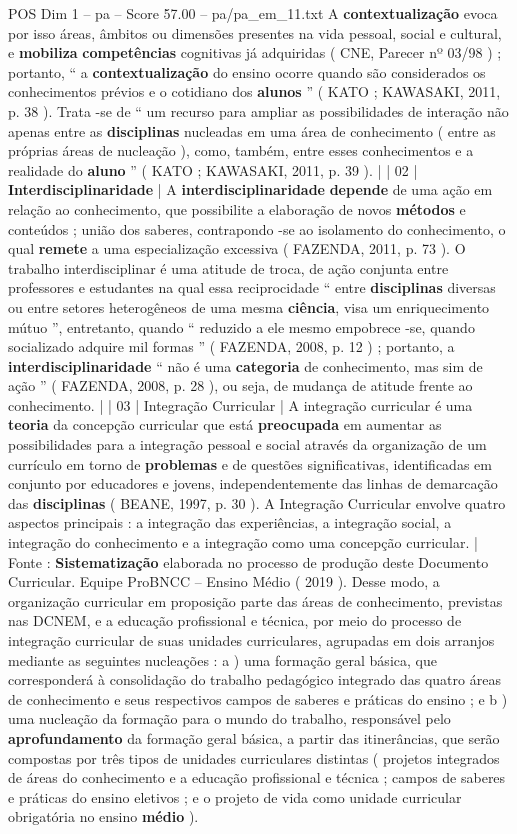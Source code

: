 \begin{textsample}{POS Dim 1 – pa – Score 57.00 – pa/pa\_em\_11.txt}
A \textbf{contextualização} evoca por isso áreas, âmbitos ou dimensões presentes na vida pessoal, social e cultural, e \textbf{mobiliza} \textbf{competências} cognitivas já adquiridas ( CNE, Parecer nº 03/98 ) ; portanto, “ a \textbf{contextualização} do ensino ocorre quando são considerados os conhecimentos prévios e o cotidiano dos \textbf{alunos} ” ( KATO ; KAWASAKI, 2011, p. 38 ).
Trata -se de “ um recurso para ampliar as possibilidades de interação não apenas entre as \textbf{disciplinas} nucleadas em uma área de conhecimento ( entre as próprias áreas de nucleação ), como, também, entre esses conhecimentos e a realidade do \textbf{aluno} ” ( KATO ; KAWASAKI, 2011, p. 39 ). | | 02 | \textbf{Interdisciplinaridade} | A \textbf{interdisciplinaridade} \textbf{depende} de uma ação em relação ao conhecimento, que possibilite a elaboração de novos \textbf{métodos} e conteúdos ; união dos saberes, contrapondo -se ao isolamento do conhecimento, o qual \textbf{remete} a uma especialização excessiva ( FAZENDA, 2011, p. 73 ).
O trabalho interdisciplinar é uma atitude de troca, de ação conjunta entre professores e estudantes na qual essa reciprocidade “ entre \textbf{disciplinas} diversas ou entre setores heterogêneos de uma mesma \textbf{ciência}, visa um enriquecimento mútuo ”, entretanto, quando “ reduzido a ele mesmo empobrece -se, quando socializado adquire mil formas ” ( FAZENDA, 2008, p. 12 ) ; portanto, a \textbf{interdisciplinaridade} “ não é uma \textbf{categoria} de conhecimento, mas sim de ação ” ( FAZENDA, 2008, p. 28 ), ou seja, de mudança de atitude frente ao conhecimento. | | 03 | Integração Curricular | A integração curricular é uma \textbf{teoria} da concepção curricular que está \textbf{preocupada} em aumentar as possibilidades para a integração pessoal e social através da organização de um currículo em torno de \textbf{problemas} e de questões significativas, identificadas em conjunto por educadores e jovens, independentemente das linhas de demarcação das \textbf{disciplinas} ( BEANE, 1997, p. 30 ).
A Integração Curricular envolve quatro aspectos principais : a integração das experiências, a integração social, a integração do conhecimento e a integração como uma concepção curricular. | Fonte : \textbf{Sistematização} elaborada no processo de produção deste Documento Curricular.
Equipe ProBNCC – Ensino Médio ( 2019 ).
Desse modo, a organização curricular em proposição parte das áreas de conhecimento, previstas nas DCNEM, e a educação profissional e técnica, por meio do processo de integração curricular de suas unidades curriculares, agrupadas em dois arranjos mediante as seguintes nucleações : a ) uma formação geral básica, que corresponderá à consolidação do trabalho pedagógico integrado das quatro áreas de conhecimento e seus respectivos campos de saberes e práticas do ensino ; e b ) uma nucleação da formação para o mundo do trabalho, responsável pelo \textbf{aprofundamento} da formação geral básica, a partir das itinerâncias, que serão compostas por três tipos de unidades curriculares distintas ( projetos integrados de áreas do conhecimento e a educação profissional e técnica ; campos de saberes e práticas do ensino eletivos ; e o projeto de vida como unidade curricular obrigatória no ensino \textbf{médio} ).

\end{textsample}
